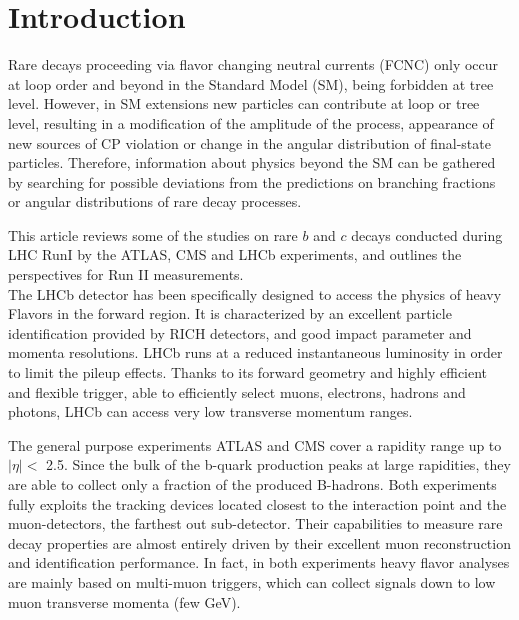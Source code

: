 %
%
%
\section{Introduction}

Rare decays proceeding via flavor changing neutral currents (FCNC) only occur at loop order and beyond in the Standard Model (SM), being forbidden at tree level.
However, in SM extensions new particles can contribute at loop or tree level, resulting in a modification of the amplitude of the process, appearance of new sources of CP violation or change in the angular distribution of final-state particles.
Therefore, information about physics beyond the SM can be gathered by searching for possible deviations from the predictions on branching fractions or angular distributions of rare decay processes.

This article reviews some of the studies on rare $b$ and $c$ decays conducted during LHC RunI by the ATLAS\cite{ATLAS}, CMS\cite{CMS} and LHCb\cite{LHCb} experiments, and outlines the perspectives for Run II measurements.\\
The LHCb detector has been specifically designed to access the physics of heavy Flavors in the forward region.
It is characterized by an excellent particle identification provided by RICH detectors, and good impact parameter and momenta resolutions.
LHCb runs at a reduced instantaneous luminosity in order to limit the pileup effects.
Thanks to its forward geometry and highly efficient and flexible trigger, able to efficiently select muons, electrons, hadrons and photons, LHCb can access very low transverse momentum ranges.

The general purpose experiments ATLAS and CMS cover a rapidity range up to $|\eta | <$ 2.5.
Since the bulk of the b-quark production peaks at large rapidities, they are able to collect only a fraction of the produced B-hadrons.
Both experiments fully exploits the tracking devices located closest to the interaction point and the muon-detectors, the farthest out sub-detector. 
Their capabilities to measure rare decay properties are almost entirely driven by their excellent muon reconstruction and identification performance.
In fact, in both experiments heavy flavor analyses are mainly based on multi-muon triggers, which can collect signals down to low muon transverse momenta (few GeV).

